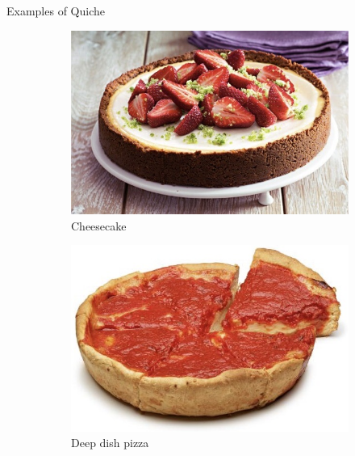 \documentclass{beamer}
\begin{document}
\begin{frame}{Examples of Quiche}
    \begin{figure}
        \begin{subfigure}{.4\textwidth}
          \centering
          \includegraphics[width=.8\linewidth]{quiche/24_cheesecake.jpg}
          \caption{\label{fig:cheesecake}Cheesecake}
        \end{subfigure}
        \begin{subfigure}{.4\textwidth}
          \centering
          \includegraphics[width=.8\linewidth]{quiche/25_deep_dish.jpg}
          \caption{\label{fig:deep-dish}Deep dish pizza}
        \end{subfigure}%
        \begin{subfigure}{.4\textwidth}

\end{subfigure}
\end{figure}
\end{frame}
\end{document}
